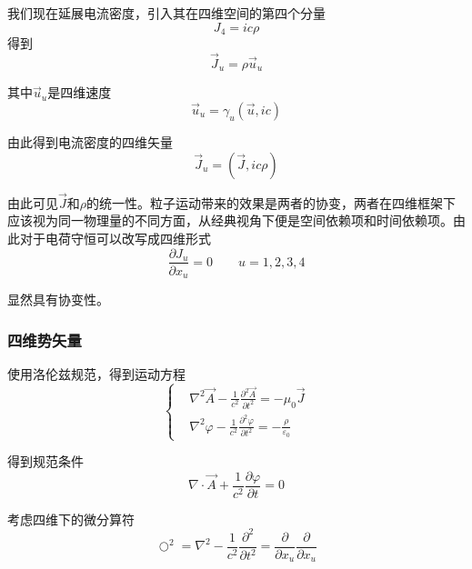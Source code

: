 \documentclass[UTF8]{ctexart}
\begin{document}
    我们现在延展电流密度，引入其在四维空间的第四个分量
    \begin{equation}
        J_4 = i c \rho 
    \end{equation}
\noindent 得到 
\begin{equation}
    \vec{J}_u = \rho \vec{u}_u
\end{equation}

\noindent 其中$\vec{u}_u$是四维速度
\begin{equation}
    \vec{u}_u = \gamma_u(\vec{u},ic)
\end{equation}

\noindent 由此得到电流密度的四维矢量
\begin{equation}
    \vec{J}_u = (\vec{J},ic\rho)
\end{equation}

\noindent 由此可见$\vec{J}$和$\rho$的统一性。粒子运动带来的效果是两者的协变，两者在四维框架下应该视为同一物理量的不同方面，从经典视角下便是空间依赖项和时间依赖项。由此对于电荷守恒可以改写成四维形式
\begin{equation}
    \frac{\partial J_u}{\partial x_u} = 0 \qquad u =1,2,3,4
\end{equation}

\noindent 显然具有协变性。

    \subsubsection{四维势矢量}
    使用洛伦兹规范，得到运动方程
    \begin{equation}
        \left \{ \begin{aligned}
            &\nabla^2 \vec{A} - \frac{1}{c^2} \frac{\partial^2 \vec{A}}{\partial t^2} = -\mu_0 \vec{J}  \\
            &\nabla^2 \varphi - \frac{1}{c^2} \frac{\partial^2 \varphi }{\partial t^2} = - \frac{\rho}{\varepsilon_0}
        \end{aligned} \right.
    \end{equation}

\noindent 得到规范条件
\begin{equation}
    \nabla \cdot \vec{A} + \frac{1}{c^2} \frac{\partial \varphi }{\partial t} = 0
\end{equation}

    考虑四维下的微分算符
    \begin{equation}
        \bigcirc^2 = \nabla^2 - \frac{1}{c^2}\frac{\partial^2}{\partial t^2} = \frac{\partial}{\partial x_u}\frac{\partial}{\partial x_u}
    \end{equation}
\end{document}
